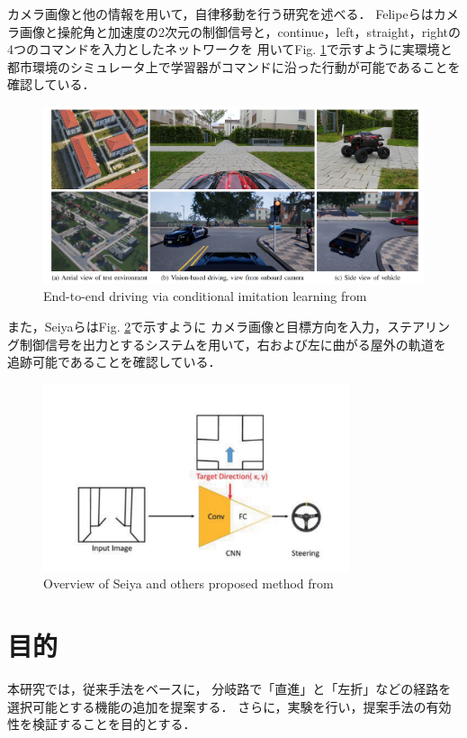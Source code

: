 \newpage
カメラ画像と他の情報を用いて，自律移動を行う研究を述べる．
Felipeら\cite{razikon}はカメラ画像と操舵角と加速度の2次元の制御信号と，continue，left，straight，rightの4つのコマンドを入力としたネットワークを
用いてFig. \ref{fig::Conditional_Imitation_Learning}で示すように実環境と都市環境のシミュレータ上で学習器がコマンドに沿った行動が可能であることを
確認している．
\begin{figure}[H]
    \centering
    \includegraphics[width = 12cm]{./figs/End-to-end_Driving_via_Conditional_Imitation_Learning.pdf}
    \caption{End-to-end  driving  via  conditional  imitation  learning from \cite{razikon}}
    \label{fig::Conditional_Imitation_Learning}
\end{figure}

また，Seiyaら\cite{nagoya}はFig. \ref{fig::nagoyaabst}で示すように
カメラ画像と目標方向を入力，ステアリング制御信号を出力とするシステムを用いて，右および左に曲がる屋外の軌道を
追跡可能であることを確認している．

\begin{figure}[H]
    \centering
    \includegraphics[width = 9cm]{./figs/End-to-End_Navigation_with_Branch_Turning_Support_using_Convolutional_Neural_Network_abst.pdf}
    \caption{Overview of Seiya and others proposed method from \cite{nagoya}}
    \label{fig::nagoyaabst}
\end{figure}


\section{目的}
本研究では，従来手法をベースに，
分岐路で「直進」と「左折」などの経路を選択可能とする機能の追加を提案する．
さらに，実験を行い，提案手法の有効性を検証することを目的とする．

